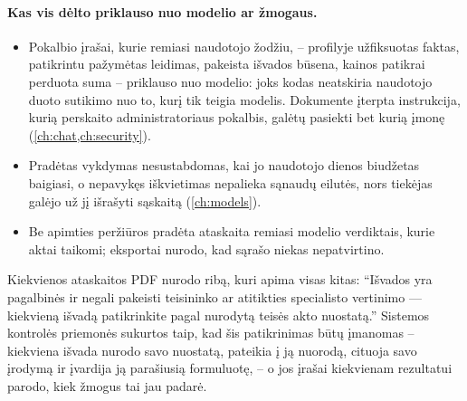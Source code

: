 \paragraph{Kas vis dėlto priklauso nuo modelio ar žmogaus.}
\begin{itemize}
  \item Pokalbio įrašai, kurie remiasi naudotojo žodžiu, -- profilyje užfiksuotas faktas,
    patikrintu pažymėtas leidimas,
    pakeista išvados būsena, kainos patikrai perduota suma -- priklauso nuo modelio: joks
    kodas neatskiria naudotojo duoto sutikimo nuo to, kurį tik teigia modelis. Dokumente
    įterpta instrukcija, kurią perskaito administratoriaus pokalbis, galėtų pasiekti bet
    kurią įmonę (\cref{ch:chat,ch:security}).
  \item Pradėtas vykdymas nesustabdomas, kai jo naudotojo dienos biudžetas baigiasi, o
    nepavykęs iškvietimas nepalieka sąnaudų eilutės, nors tiekėjas galėjo už jį išrašyti
    sąskaitą (\cref{ch:models}).
  \item Be apimties peržiūros pradėta ataskaita remiasi modelio verdiktais, kurie aktai
    taikomi; eksportai nurodo, kad sąrašo niekas nepatvirtino.
\end{itemize}

Kiekvienos ataskaitos PDF nurodo ribą, kuri apima visas kitas: \enquote{Išvados yra
pagalbinės ir negali pakeisti teisininko ar atitikties specialisto vertinimo --- kiekvieną
išvadą patikrinkite pagal nurodytą teisės akto nuostatą.} Sistemos kontrolės priemonės
sukurtos taip, kad šis patikrinimas būtų įmanomas -- kiekviena išvada nurodo savo nuostatą,
pateikia į ją nuorodą, cituoja savo įrodymą ir įvardija ją parašiusią formuluotę, -- o jos
įrašai kiekvienam rezultatui parodo, kiek žmogus tai jau padarė.
